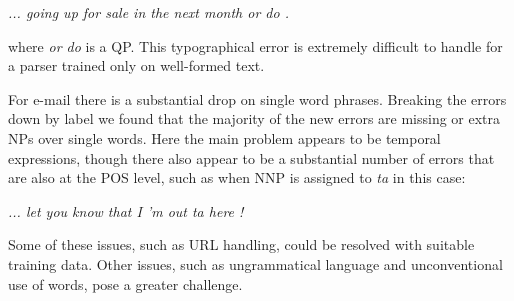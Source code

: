 \vspace{3mm}
\emph{... going up for sale in the next month or do .}
\vspace{3mm}

\noindent where \emph{or do} is a QP.  This typographical error is extremely
difficult to handle for a parser trained only on well-formed text.

For e-mail there is a substantial drop on single word phrases.  Breaking the
errors down by label we found that the majority of the new errors are missing
or extra NPs over single words.  Here the main problem appears to be temporal
expressions, though there also appear to be a substantial number of errors that
are also at the POS level, such as when NNP is assigned to \emph{ta} in this
case:

\vspace{3mm}
\emph{... let you know that I 'm out ta here !}
\vspace{3mm}

Some of these issues, such as URL handling, could be resolved with suitable
training data.  Other issues, such as ungrammatical language and
unconventional use of words, pose a greater challenge.

